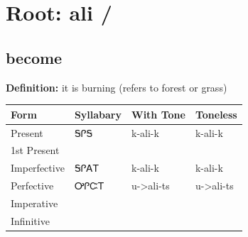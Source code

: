 \documentclass{article}%
\begin{document}
%
\normalsize%
\section*{Root: ali / }%
\subsection*{become}%
\textbf{Definition: }%
it is burning (refers to forest or grass)%
\\[0.5em]%
\begin{tabular}{|l|l|l|l|}%
\hline%
\textbf{Form}&\textbf{Syllabary}&\textbf{With Tone}&\textbf{Toneless}\\%
\hline%
Present&ᎦᎵᎦ&k{-}ali{-}k&k{-}ali{-}k\\%
1st Present&&&\\%
Imperfective&ᎦᎵᎪᎢ&k{-}ali{-}k&k{-}ali{-}k\\%
Perfective&ᎤᎵᏨᎢ&u{-}>ali{-}ts&u{-}>ali{-}ts\\%
Imperative&&&\\%
Infinitive&&&\\%
\hline%
\end{tabular}%
\\[1em]%
\end{document}
